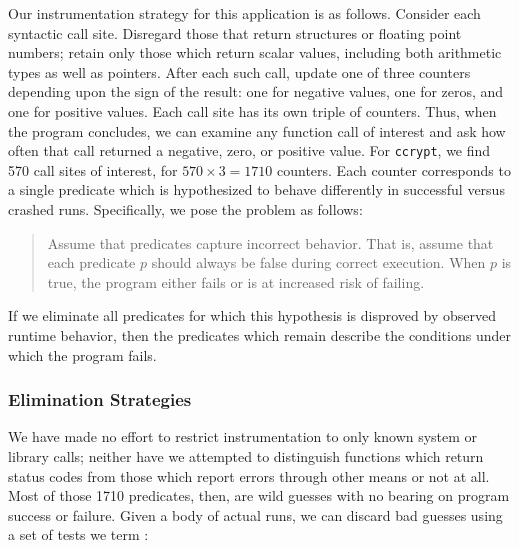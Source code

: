 Our instrumentation strategy for this application is as follows.
Consider each syntactic call site.  Disregard those that return
structures or floating point numbers; retain only those which return
scalar values, including both arithmetic types as well as pointers.
After each such call, update one of three counters depending upon the
sign of the result: one for negative values, one for zeros, and one
for positive values.  Each call site has its own triple of counters.
Thus, when the program concludes, we can examine any function call of
interest and ask how often that call returned a negative, zero, or
positive value.  For
\texttt{ccrypt}, we find 570 call sites of interest, for $570 \times 3 =
1710$ counters.  Each counter corresponds to a single predicate which
is hypothesized to behave differently in successful versus crashed
runs.  Specifically, we pose the problem as follows:

\begin{quote}
  Assume that predicates capture incorrect behavior.  That is, assume
  that each predicate $p$ should always be false during correct
  execution.  When $p$ is true, the program either fails or is at
  increased risk of failing.
\end{quote}

If we eliminate all predicates for which this hypothesis is disproved
by observed runtime behavior, then the predicates which remain
describe the conditions under which the program fails.

\subsubsection{Elimination Strategies}

We have made no effort to restrict instrumentation to only known
system or library calls; neither have we attempted to distinguish
functions which return status codes from those which report errors
through other means or not at all.  Most of those 1710 predicates,
then, are wild guesses with no bearing on program success or failure.
Given a body of actual runs, we can discard bad guesses using a set of
tests we term :


